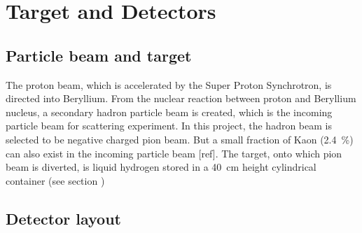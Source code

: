 \section{Target and Detectors}
\subsection{Particle beam and target}
The proton beam, which is accelerated by the Super Proton Synchrotron, is directed into Beryllium. From the nuclear reaction between proton and Beryllium nucleus, a secondary hadron particle beam is created, which is the incoming particle beam for scattering experiment. In this project, the hadron beam is selected to be negative charged pion beam. But a small fraction of Kaon (\SI{2.4}{\percent}) can also exist in the incoming particle beam [ref]. The target, onto which pion beam is diverted, is liquid hydrogen stored in a \SI{40}{\centi\meter} height cylindrical container (see section )
\subsection{Detector layout}

